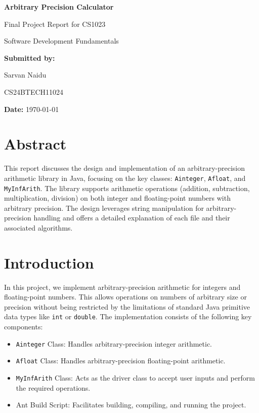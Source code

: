 \documentclass[12pt]{article}
\begin{document}
\begin{titlepage}
    \centering
    \vspace*{3cm}
    
    {\Huge \textbf{Arbitrary Precision Calculator} \par}
    \vspace{1cm}
    
    {\Large Final Project Report for CS1023 \par}
    {\Large Software Development Fundamentals \par}
    
    \vspace{2.5cm}
    
    {\large \textbf{Submitted by:} \par}
    \vspace{0.3cm}
    {\large Sarvan Naidu \par}
    {\large CS24BTECH11024 \par}
    
    \vspace{2cm}
    
    {\large \textbf{Date:} \today \par}
    
    \vfill
\end{titlepage}
\section{Abstract}
This report discusses the design and implementation of an arbitrary-precision arithmetic library in Java, focusing on the key classes: \texttt{Ainteger}, \texttt{Afloat}, and \texttt{MyInfArith}. The library supports arithmetic operations (addition, subtraction, multiplication, division) on both integer and floating-point numbers with arbitrary precision. The design leverages string manipulation for arbitrary-precision handling and offers a detailed explanation of each file and their associated algorithms.

\section{Introduction}
In this project, we implement arbitrary-precision arithmetic for integers and floating-point numbers. This allows operations on numbers of arbitrary size or precision without being restricted by the limitations of standard Java primitive data types like \texttt{int} or \texttt{double}. The implementation consists of the following key components:
\begin{itemize}
    \item \texttt{Ainteger} Class: Handles arbitrary-precision integer arithmetic.
    \item \texttt{Afloat} Class: Handles arbitrary-precision floating-point arithmetic.
    \item \texttt{MyInfArith} Class: Acts as the driver class to accept user inputs and perform the required operations.
    \item Ant Build Script: Facilitates building, compiling, and running the project.
\end{itemize}
\end{document}
